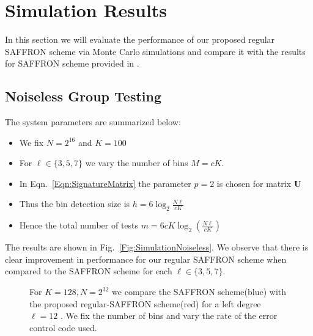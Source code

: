 \documentclass[conference,twocolumn]{IEEEtran}
\newcommand*{\FigPath}{../Figures}
\begin{document}
\section{Simulation Results}
In this section we will evaluate the performance of our proposed regular SAFFRON scheme via Monte Carlo simulations and compare it with the results for SAFFRON scheme provided in \cite{lee2015saffron}.
\subsection*{Noiseless Group Testing}
The system parameters are summarized below:
\begin{itemize}
\item We fix $N=2^{16}$ and $K=100$
\item For $\ell\in\{3,5,7\}$ we vary the number of bins $M=c K$.
\item In Eqn.~\ref{Eqn:SignatureMatrix} the parameter $p=2$ is chosen for matrix $\mathbf{U}$
\item Thus the bin detection size is $h=6\log_2 \frac{N\ell}{cK}$
\item Hence the total number of tests $m=6cK\log_2 \left(\frac{N\ell}{cK}\right)$
\end{itemize}
The results are shown in Fig.~\ref{Fig:SimulationNoiseless}. We observe that there is clear improvement in performance for our regular SAFFRON scheme when compared to the SAFFRON scheme for each $\ell\in\{3,5,7\}$.

\begin{figure}
\centering
\resizebox{0.86\columnwidth}{!}{}
\caption{For $K=128, N=2^{32}$ we compare the SAFFRON scheme(blue) \cite{lee2015saffron} with the proposed regular-SAFFRON scheme(red) for a left degree $\ell=12$  . We fix the number of bins and vary the rate of the error control code used.}
\label{Fig:SimulationNoisy}
\end{figure}
\end{document}
